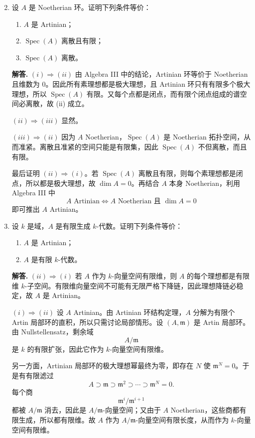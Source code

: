 \documentclass[a4paper]{ctexart}
\begin{document}
\begin{enumerate}[leftmargin=*, label=\textbf{8.\arabic*.}]
\setcounter{enumi}{1}

\item 设 \(A\) 是 Noetherian 环。证明下列条件等价：
\begin{enumerate}[label=(\roman*)]
\item \(A\) 是 Artinian；
\item \(\operatorname{Spec}(A)\) 离散且有限；
\item \(\operatorname{Spec}(A)\) 离散。
\end{enumerate}

\textbf{解答.}
\((i)\Rightarrow(ii)\)\; 由 Algebra III 中的结论，Artinian 环等价于 Noetherian 且维数为 \(0\)。因此所有素理想都是极大理想，且 Artinian 环只有有限多个极大理想，所以 \(\operatorname{Spec}(A)\) 有限。又每个点都是闭点，而有限个闭点组成的谱空间必离散，故 (ii) 成立。

\((ii)\Rightarrow(iii)\)\; 显然。

\((iii)\Rightarrow(ii)\)\; 因为 \(A\) Noetherian，\(\operatorname{Spec}(A)\) 是 Noetherian 拓扑空间，从而准紧。离散且准紧的空间只能是有限集，因此 \(\operatorname{Spec}(A)\) 不但离散，而且有限。

最后证明 \((ii)\Rightarrow(i)\)。若 \(\operatorname{Spec}(A)\) 离散且有限，则每个素理想都是闭点，所以都是极大理想，故 \(\dim A=0\)。再结合 \(A\) 本身 Noetherian，利用 Algebra III 中
\[
A \text{ Artinian}\Longleftrightarrow A \text{ Noetherian 且 }\dim A=0
\]
即可推出 \(A\) Artinian。

\item 设 \(k\) 是域，\(A\) 是有限生成 \(k\)-代数。证明下列条件等价：
\begin{enumerate}[label=(\roman*)]
\item \(A\) 是 Artinian；
\item \(A\) 是有限 \(k\)-代数。
\end{enumerate}

\textbf{解答.}
\((ii)\Rightarrow(i)\)\; 若 \(A\) 作为 \(k\)-向量空间有限维，则 \(A\) 的每个理想都是有限维 \(k\)-子空间。有限维向量空间不可能有无限严格下降链，因此理想降链必稳定，故 \(A\) 是 Artinian。

\((i)\Rightarrow(ii)\)\; 设 \(A\) Artinian。由 Artinian 环结构定理，\(A\) 分解为有限个 Artin 局部环的直积，所以只需讨论局部情形。设 \((A,\mathfrak m)\) 是 Artin 局部环。由 Nullstellensatz，剩余域
\[
A/\mathfrak m
\]
是 \(k\) 的有限扩张，因此它作为 \(k\)-向量空间有限维。

另一方面，Artinian 局部环的极大理想幂最终为零，即存在 \(N\) 使 \(\mathfrak m^N=0\)。于是有有限滤过
\[
A\supset \mathfrak m\supset \mathfrak m^2\supset \cdots \supset \mathfrak m^N=0.
\]
每个商
\[
\mathfrak m^i/\mathfrak m^{i+1}
\]
都被 \(A/\mathfrak m\) 消去，因此是 \(A/\mathfrak m\)-向量空间；又由于 \(A\) Noetherian，这些商都有限生成，所以都有限维。故 \(A\) 作为 \(A/\mathfrak m\)-向量空间有限长度，从而作为 \(k\)-向量空间有限维。


\end{enumerate}
\end{document}

